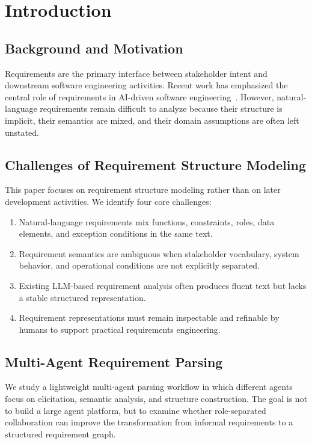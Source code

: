 \section{Introduction}
\label{introduction}

\subsection{Background and Motivation}
\label{sec:intro-background}

Requirements are the primary interface between stakeholder intent and downstream software engineering activities.
Recent work has emphasized the central role of requirements in AI-driven software engineering~\cite{robinsonRequirementsAreAll2025}.
However, natural-language requirements remain difficult to analyze because their structure is implicit, their semantics are mixed, and their domain assumptions are often left unstated.

\subsection{Challenges of Requirement Structure Modeling}
\label{sec:intro-challenges}

This paper focuses on requirement structure modeling rather than on later development activities.
We identify four core challenges:
\begin{enumerate}[leftmargin=*]
  \item Natural-language requirements mix functions, constraints, roles, data elements, and exception conditions in the same text.
  \item Requirement semantics are ambiguous when stakeholder vocabulary, system behavior, and operational conditions are not explicitly separated.
  \item Existing LLM-based requirement analysis often produces fluent text but lacks a stable structured representation.
  \item Requirement representations must remain inspectable and refinable by humans to support practical requirements engineering.
\end{enumerate}

\subsection{Multi-Agent Requirement Parsing}
\label{sec:intro-multi-agent}

We study a lightweight multi-agent parsing workflow in which different agents focus on elicitation, semantic analysis, and structure construction.
The goal is not to build a large agent platform, but to examine whether role-separated collaboration can improve the transformation from informal requirements to a structured requirement graph.

